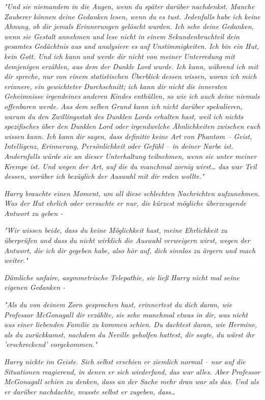 {\emph{"Und sie niemandem in die Augen, wenn du später darüber nachdenkst. Manche Zauberer können deine Gedanken lesen, wenn du es tust. Jedenfalls habe ich keine Ahnung, ob dir jemals Erinnerungen gelöscht wurden. Ich sehe deine Gedanken, wenn sie Gestalt annehmen und lese nicht in einem Sekundenbruchteil dein gesamtes Gedächtnis aus und analysiere es auf Unstimmigkeiten. Ich bin ein Hut, kein Gott. Und ich kann und werde dir nicht von meiner Unterredung mit demjenigen erzählen, aus dem der Dunkle Lord wurde. Ich kann, während ich mit dir spreche,} \emph{nur} \emph{von einem statistischen Überblick dessen wissen, woran ich mich erinnere, ein gewichteter Durchschnitt; ich kann dir} \emph{nicht} \emph{\emph{die innersten Geheimnisse irgendeines anderen Kindes enthüllen, so wie ich}} \emph{\emph{auch deine niemals offenbaren werde. Aus dem selben Grund kann ich nicht darüber spekulieren, warum du den Zwillingsstab des Dunklen Lords erhalten hast, weil ich nichts spezifisches über den Dunklen Lord oder irgendwelche Ähnlichkeiten zwischen euch wissen kann. Ich}} \emph{kann} \emph{\emph{dir sagen, dass definitiv keine Art von Phantom -- Geist, Intelligenz, Erinnerung, Persönlichkeit oder Gefühl -- in deiner Narbe ist. Andernfalls würde sie an dieser Unterhaltung teilnehmen, wenn sie unter meiner Krempe ist. Und wegen der Art, auf die du manchmal zornig wirst… das war Teil dessen, worüber ich bezüglich der Auswahl mit dir reden wollte."}}

\emph{Harry brauchte einen Moment, um all diese schlechten Nachrichten aufzunehmen. Was der Hut ehrlich oder versuchte er nur, die} \emph{\emph{kürzest}} \emph{mögliche überzeugende Antwort zu geben -}

\emph{\emph{"Wir wissen beide, dass du keine Möglichkeit hast, meine Ehrlichkeit zu überprüfen und dass du nicht wirklich die Auswahl verweigern wirst, wegen der Antwort, die ich dir gegeben habe, also hör auf, dich sinnlos zu ärgern und mach weiter."}}

\emph{Dämliche unfaire, asymmetrische Telepathie, sie ließ Harry nicht mal seine eigenen Gedanken -}

\emph{\emph{"Als du von deinem Zorn gesprochen hast, erinnertest du dich daran, wie Professor McGonagall dir erzählte, sie sehe manchmal etwas in dir, was nicht aus einer liebenden Familie zu kommen schien. Du dachtest daran, wie Hermine, als du zurückkamst, nachdem du Neville geholfen hattest, dir sagte, du wärst ihr 'erschreckend' vorgekommen."}}

\emph{Harry nickte im Geiste. Sich selbst erschien er ziemlich normal -- nur auf die Situationen reagierend, in denen er sich wiederfand, das war alles. Aber Professor McGonagall schien zu denken, dass an der Sache mehr dran war als das. Und als er darüber nachdachte, musste selbst er zugeben, dass…}

}
